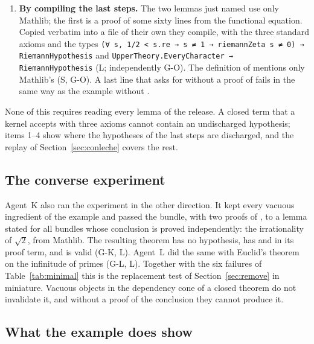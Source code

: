 \begin{enumerate}
and the dependency cone of  contains \NconeProjThm\ theorems of the release (Appendix~\ref{app:data}).
In the example nobody supplies .
\item \textbf{By compiling the last steps.} The two lemmas just named use only Mathlib; the first is a proof of some sixty lines from the functional equation.
Copied verbatim into a file of their own they compile, with the three standard axioms and the types
\texttt{(∀ s, 1/2 < s.re → s ≠ 1 → riemannZeta s ≠ 0) → RiemannHypothesis} and \texttt{UpperTheory.EveryCharacter → RiemannHypothesis} (\textsf{L}; independently \textsf{G-O}).
The definition of  mentions only Mathlib's  (\textsf{S}, \textsf{G-O}).
A last line that asks for  without a proof of  fails in the same way as the example without .
\end{enumerate}

None of this requires reading every lemma of the release. A closed term that a kernel accepts with three axioms cannot contain an undischarged hypothesis; items 1--4 show where the hypotheses of the last steps are discharged, and the replay of Section~\ref{sec:conleche} covers the rest.

\subsection{The converse experiment}

Agent~K also ran the experiment in the other direction. It kept every vacuous ingredient of the example and passed the bundle, with two proofs of , to a lemma stated for all bundles whose conclusion is proved independently: the irrationality of $\sqrt{2}$, from Mathlib.
The resulting theorem has no hypothesis, has  and  in its proof term, and is valid (\textsf{G-K}, \textsf{L}). Agent~L did the same with Euclid's theorem on the infinitude of primes (\textsf{G-L}, \textsf{L}).
Together with the six failures of Table~\ref{tab:minimal} this is the replacement test of Section~\ref{sec:remove} in miniature. Vacuous objects in the dependency cone of a closed theorem do not invalidate it, and without a proof of the conclusion they cannot produce it.

\subsection{What the example does show}

